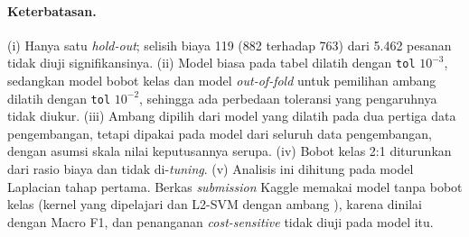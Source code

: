 \paragraph{Keterbatasan.} (i) Hanya satu \textit{hold-out}; selisih biaya 119 (882 terhadap 763) dari 5.462 pesanan tidak diuji signifikansinya. (ii) Model biasa pada tabel dilatih dengan \texttt{tol} $10^{-3}$, sedangkan model bobot kelas dan model \textit{out-of-fold} untuk pemilihan ambang dilatih dengan \texttt{tol} $10^{-2}$, sehingga ada perbedaan toleransi yang pengaruhnya tidak diukur. (iii) Ambang dipilih dari model yang dilatih pada dua pertiga data pengembangan, tetapi dipakai pada model dari seluruh data pengembangan, dengan asumsi skala nilai keputusannya serupa. (iv) Bobot kelas 2:1 diturunkan dari rasio biaya dan tidak di-\textit{tuning}. (v) Analisis ini dihitung pada model Laplacian tahap pertama. Berkas \textit{submission} Kaggle memakai model tanpa bobot kelas (kernel yang dipelajari dan L2-SVM dengan ambang \SVMBaruAmbang{}), karena dinilai dengan Macro F1, dan penanganan \textit{cost-sensitive} tidak diuji pada model itu.
